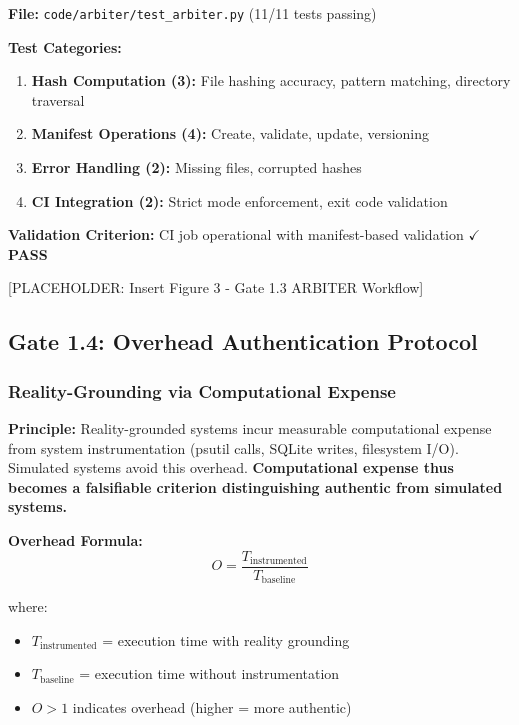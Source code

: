 \documentclass[11pt]{article}
\begin{document}
\textbf{File:} \texttt{code/arbiter/test\_arbiter.py} (11/11 tests passing)

\textbf{Test Categories:}
\begin{enumerate}
\item \textbf{Hash Computation (3):} File hashing accuracy, pattern matching, directory traversal
\item \textbf{Manifest Operations (4):} Create, validate, update, versioning
\item \textbf{Error Handling (2):} Missing files, corrupted hashes
\item \textbf{CI Integration (2):} Strict mode enforcement, exit code validation
\end{enumerate}

\textbf{Validation Criterion:} CI job operational with manifest-based validation $\checkmark$ \textbf{PASS}

[PLACEHOLDER: Insert Figure 3 - Gate 1.3 ARBITER Workflow]

\subsection{Gate 1.4: Overhead Authentication Protocol}

\subsubsection{Reality-Grounding via Computational Expense}

\textbf{Principle:} Reality-grounded systems incur measurable computational expense from system instrumentation (psutil calls, SQLite writes, filesystem I/O). Simulated systems avoid this overhead. \textbf{Computational expense thus becomes a falsifiable criterion distinguishing authentic from simulated systems.}

\textbf{Overhead Formula:}
\begin{equation}
O = \frac{T_{\text{instrumented}}}{T_{\text{baseline}}}
\end{equation}

where:
\begin{itemize}
\item $T_{\text{instrumented}}$ = execution time with reality grounding
\item $T_{\text{baseline}}$ = execution time without instrumentation
\item $O > 1$ indicates overhead (higher = more authentic)
\end{itemize}
\end{document}
